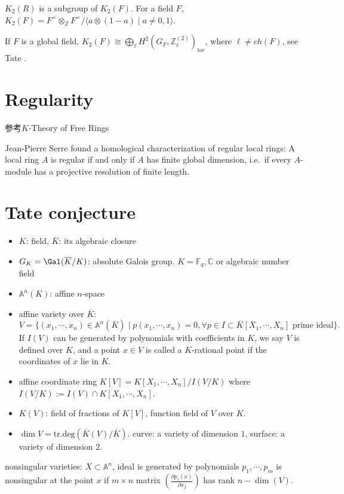 $K_2(R)$ is a subgroup of $K_2(F)$.
\cite{K-theory/0482}
For a field $F$, $K_2(F)=F^{\times} \otimes_{\mathbb{Z}}F^{\times}/\langle a\otimes (1-a) \mid a\neq 0,1\rangle$. 

If $F$ is a global field, $K_2(F)\cong \bigoplus_{\ell} H^2(G_F,\mathbb{Z}_{\ell}^{(2)})_{tor}$, where $\ell \neq ch(F)$, see Tate \cite{MR55:2847}.

\section{Regularity}
参考$K$-Theory of Free Rings

 Jean-Pierre Serre found a homological characterization of regular local rings: A local ring $A$ is regular if and only if $A$ has finite global dimension, i.e.\ if every $A$-module has a projective resolution of finite length.














\section{Tate conjecture}
\begin{itemize}
	\item $K$: field, $\overline{K}$: its algebraic closure
	\item $G_K=\Gal(\overline{K}/K)$: absolute Galois group. $K=\mathbb{F}_q,\mathbb{C}$ or algebraic number field
	\item $\mathbb{A}^n(K)$: affine $n$-space
	\item affine variety over $\overline{K}$: 
	\[V=\{(x_1,\cdots,x_n)\in \mathbb{A}^n(\overline{K})\mid p(x_1,\cdots,x_n)=0, \forall p\in I\subset \overline{K}[X_1,\cdots,X_n] \text{ prime ideal}\}.\]
	 If $I(V)$ can be generated by polynomials with coefficients in $K$, we say $V$ is defined over $K$, and a point $x\in V$ is called a $K$-rational point if the coordinates of $x$ lie in $K$.
	\item affine coordinate ring $K[V]=K[X_1,\cdots,X_n]/I(V/K)$ where $I(V/K):=I(V)\cap K[X_1,\cdots,X_n]$.
	\item $K(V)$: field of fractions of $K[V]$, function field of $V$ over $K$. 
	\item $\dim V=\mathrm{tr.deg}(\overline{K}(V)/\overline{K})$. curve: a variety of dimension $1$, surface: a variety of dimension $2$.
\end{itemize}
nonsingular varieties: $X\subset \mathbb{A}^n$, ideal is generated by polynomials $p_1,\cdots,p_m$ is nonsingular at the point $x$ if $m\times n$ matrix $(\frac{\partial p_i(x)}{\partial x_j})$ has rank $n-\dim(V)$.

